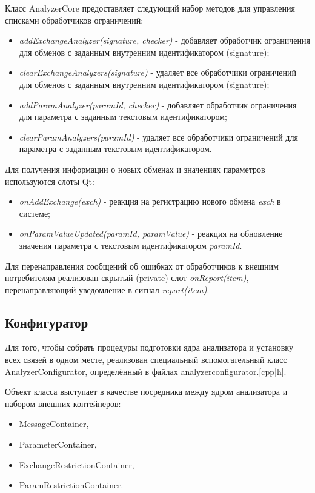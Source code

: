 Класс AnalyzerCore предоставляет следующий набор методов для управления 
списками обработчиков ограничений:

\begin{itemize}
 \item \textit{addExchangeAnalyzer(signature, checker)} - добавляет 
обработчик ограничения для обменов с заданным внутренним идентификатором 
(signature);
 \item \textit{clearExchangeAnalyzers(signature)} - удаляет все обработчики 
ограничений для обменов с заданным внутренним идентификатором (signature);
 \item \textit{addParamAnalyzer(paramId, checker)} - добавляет обработчик 
ограничения для параметра с заданным текстовым идентификатором;
 \item \textit{clearParamAnalyzers(paramId)} - удаляет все обработчики 
ограничений для параметра с заданным текстовым идентификатором.
\end{itemize}

Для получения информации о новых обменах и значениях параметров используются 
слоты Qt:

\begin{itemize}
 \item \textit{onAddExchange(exch)} - реакция на регистрацию нового обмена 
\textit{exch} в системе;
 \item \textit{onParamValueUpdated(paramId, paramValue)} - реакция на 
обновление значения параметра с текстовым идентификатором \textit{paramId}.
\end{itemize}

Для перенаправления сообщений об ошибках от обработчиков к внешним потребителям 
реализован скрытый (private) слот \textit{onReport(item)}, перенаправляющий 
уведомление в сигнал \textit{report(item)}.

\subsection{Конфигуратор}

Для того, чтобы собрать процедуры подготовки ядра анализатора и установку всех 
связей в одном месте, реализован специальный вспомогательный класс 
AnalyzerConfigurator, определённый в файлах analyzerconfigurator.[cpp|h]. 

Объект класса выступает в качестве посредника между ядром анализатора 
и набором внешних контейнеров:

\begin{itemize}
 \item MessageContainer,
 \item ParameterContainer,
 \item ExchangeRestrictionContainer,
 \item ParamRestrictionContainer.
\end{itemize}

